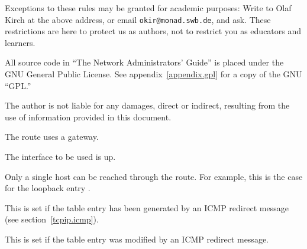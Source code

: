 \documentclass[11pt,makeidx]{report}
\def\title{``The \linux{} Network Administrators' Guide''}
\begin{document}
{{\begin{minipage}{0.9\textwidth}
  Exceptions to these rules may be granted for academic purposes: Write to
  Olaf Kirch at the above address, or email {\tt okir@monad.swb.de}, and
  ask.  These restrictions are here to protect us as authors, not to
  restrict you as educators and learners.

  \vspace{.2in}\noindent All source code in \title{} is placed under the
  GNU General Public License.  See appendix~\ref{appendix.gpl} for a copy
  of the GNU ``GPL.''

  The author is not liable for any damages, direct or indirect,
  resulting from the use of information provided in this
  document.
 \end{minipage}
}
}

{\newpage
\clearpage
\samepage \begin{dispitems}%
\ditem[G]
        The route uses a gateway.

\ditem[U]
        The interface to be used is up.

\ditem[H]
        Only a single host can be reached through the route. For
        example, this is the case for the loopback entry
        .

\ditem[D]
        This is set if the table entry has been generated
        by an ICMP redirect message (see section~\ref{tcpip.icmp}).

\ditem[M]
        This is set if the table entry was modified by an ICMP
        redirect message.
\end{dispitems}
}
\end{document}
